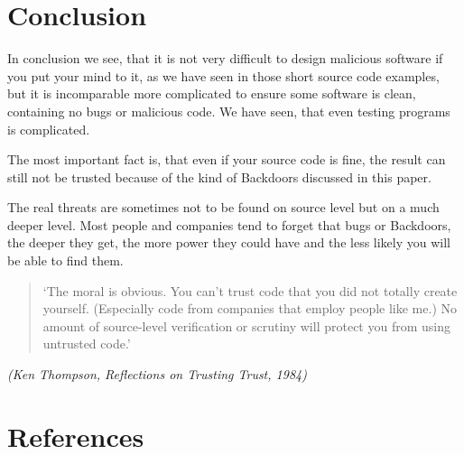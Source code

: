 \documentclass[a4paper, 12pt]{article}
\begin{document}
\newpage


\section{Conclusion}

In conclusion we see, that it is not very difficult to design malicious software if you put your mind to it, as we have seen in those short source code examples, but it is incomparable more complicated to ensure some software is clean, containing no bugs or malicious code. We have seen, that even testing programs is complicated.

The most important fact is, that even if your source code is fine, the result can still not be trusted because of the kind of Backdoors discussed in this paper.

The real threats are sometimes not to be found on source level but on a much deeper level. Most people and companies tend to forget that bugs or Backdoors, the deeper they get, the more power they could have and the less likely you will be able to find them.
\begin{quote}
`The moral is obvious. You can't trust code that you did not totally create yourself. (Especially code from
companies that employ people like me.) No amount of source-level verification or scrutiny will protect you
from using untrusted code.'
\end{quote}
\emph{(Ken Thompson, Reflections on Trusting Trust, 1984)}
\newpage


\section{References}
\end{document}
